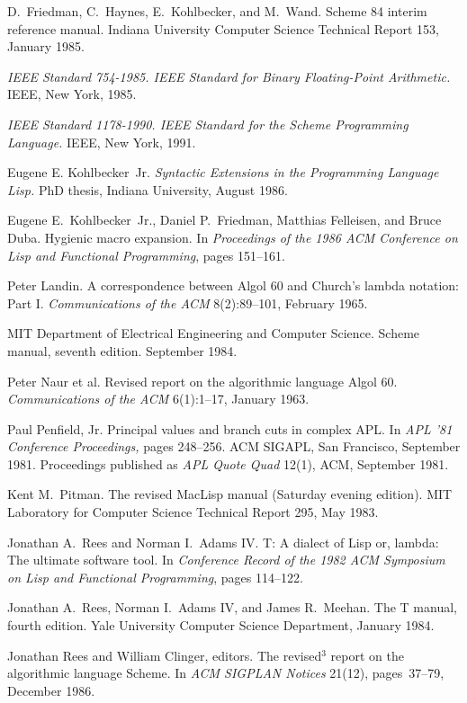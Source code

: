\begin{thebibliography}{999}
D.~Friedman, C.~Haynes, E.~Kohlbecker, and M.~Wand.
Scheme 84 interim reference manual.
Indiana University Computer Science Technical Report 153, January 1985.

{\em IEEE Standard 754-1985.  IEEE Standard for Binary Floating-Point
Arithmetic.}  IEEE, New York, 1985.

{\em IEEE Standard 1178-1990.  IEEE Standard for the Scheme
  Programming Language.}  IEEE, New York, 1991.

Eugene E. Kohlbecker~Jr.
{\em Syntactic Extensions in the Programming Language Lisp.}
PhD thesis, Indiana University, August 1986.

Eugene E.~Kohlbecker~Jr., Daniel P.~Friedman, Matthias Felleisen, and Bruce Duba.
Hygienic macro expansion.
In {\em Proceedings of the 1986 ACM Conference on Lisp
  and Functional Programming}, pages 151--161.

Peter Landin.
A correspondence between Algol 60 and Church's lambda notation: Part I.
{\em Communications of the ACM} 8(2):89--101, February 1965.

MIT Department of Electrical Engineering and Computer Science.
Scheme manual, seventh edition.
September 1984.

Peter Naur et al.
Revised report on the algorithmic language Algol 60.
{\em Communications of the ACM} 6(1):1--17, January 1963.

Paul Penfield, Jr.
Principal values and branch cuts in complex APL.
In {\em APL '81 Conference Proceedings,} pages 248--256.
ACM SIGAPL, San Francisco, September 1981.
Proceedings published as {\em APL Quote Quad} 12(1), ACM, September 1981.

Kent M.~Pitman.
The revised MacLisp manual (Saturday evening edition).
MIT Laboratory for Computer Science Technical Report 295, May 1983.

Jonathan A.~Rees and Norman I.~Adams IV.
T: A dialect of Lisp or, lambda: The ultimate software tool.
In {\em Conference Record of the 1982 ACM Symposium on Lisp and
  Functional Programming}, pages 114--122.

Jonathan A.~Rees, Norman I.~Adams IV, and James R.~Meehan.
The T manual, fourth edition.
Yale University Computer Science Department, January 1984.

Jonathan Rees and William Clinger, editors.
The revised$^3$ report on the algorithmic language Scheme.
In {\em ACM SIGPLAN Notices} 21(12), pages~37--79, December 1986.


\end{thebibliography}
